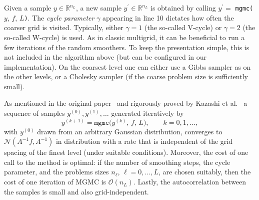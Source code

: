 \documentclass[
fontsize=11pt,
paper=a4,
numbers=noenddot
]{scrartcl}
\begin{document}
Given a sample $y \in \mathbb{R}^{n_L}$, a new sample $y^\prime \in \mathbb{R}^{n_L}$ is obtained by calling $y^\prime =$ \texttt{mgmc(}$y,\, f,\, L$\texttt{)}. The \emph{cycle parameter} $\gamma$ appearing in line 10 dictates how often the coarser grid is visited. Typically, either $\gamma = 1$ (the so-called V-cycle) or $\gamma = 2$ (the so-called W-cycle) is used. As in classic multigrid, it can be beneficial to run a few iterations of the random smoothers. To keep the presentation simple, this is not included in the algorithm above (but can be configured in our implementation). On the coarsest level one can either use a Gibbs sampler as on the other levels, or a Cholesky sampler (if the coarse problem size is sufficiently small).

As mentioned in the original paper~\cite{goodmansokal} and rigorously proved by Kazashi et al.~\cite{kazashimuellerscheichl} a sequence of samples $y^{(0)}, y^{(1)}, \dotsc$ generated iteratively by 
\begin{equation*}
    y^{(k+1)} = \texttt{mgmc(}y^{(k)},\, f,\, L\texttt{)},\qquad k = 0,1,\dotsc,
\end{equation*}
with $y^{(0)}$ drawn from an arbitrary Gaussian distribution, converges to $\mathcal{N}(A^{-1}f, A^{-1})$ in distribution with a rate that is independent of the grid spacing of the finest level (under suitable conditions). Moreover, the cost of one call to the method is optimal: if the number of smoothing steps, the cycle parameter, and the problems sizes $n_\ell$, $\ell = 0,\dotsc,L$, are chosen suitably, then the cost of one iteration of MGMC is $\mathcal{O}(n_L)$. Lastly, the autocorrelation between the samples is small and also grid-independent.




\end{document}
